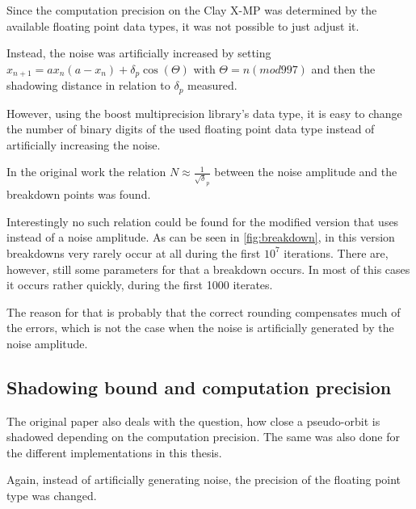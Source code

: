   Since the computation precision on the Clay X-MP was determined by the
  available floating point data types, it was not possible to just adjust it.

  Instead, the noise was artificially increased by setting $x_{n+1} =
  ax_n(a-x_n)+\delta_p \cos (\Theta)$ with $\Theta = n (mod 997)$ and then the
  shadowing distance in relation to $\delta_p$ measured.  
  
  However, using the boost multiprecision library's  data
  type, it is easy to change the number of binary digits of the used floating
  point data type instead of artificially increasing the noise.

  In the original work the relation $N \approx \frac{1}{\sqrt \delta_p}$
  between the noise amplitude and the breakdown points was found.

  Interestingly no such relation could be found for the modified version that
  uses  instead of a noise amplitude.
  As can be seen in \ref{fig:breakdown}, in this version breakdowns very rarely
  occur at all during the first $10^7$ iterations.
  There are, however, still some parameters for that a breakdown occurs.
  In most of this cases it occurs rather quickly, during the first 1000 iterates.

  The reason for that is probably that the correct rounding compensates much
  of the errors, which is not the case when the noise is artificially generated
  by the noise amplitude.

  \subsection{Shadowing bound and computation precision}
  The original paper also deals with the question, how close a pseudo-orbit is
  shadowed depending on the computation precision. 
  The same was also done for the different implementations in this thesis.

  Again, instead of artificially generating noise, the precision of the
  floating point type was changed.

